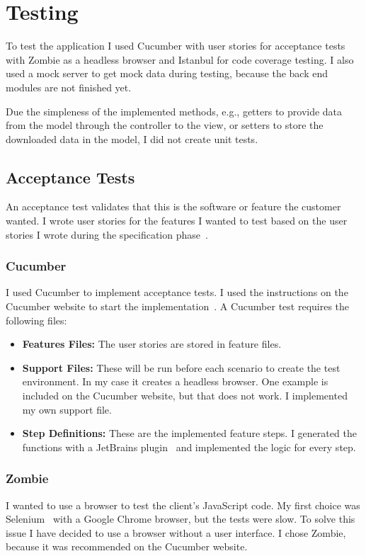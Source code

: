 \chapter{Testing}
\label{7-test}

To test the application I used Cucumber with user stories for acceptance tests with Zombie as a headless browser and Istanbul for code coverage testing. I also used a mock server to get mock data during testing, because the back end modules are not finished yet.

Due the simpleness of the implemented methods, e.g., getters to provide data from the model through the controller to the view, or setters to store the downloaded data in the model, I did not create unit tests.

\section{Acceptance Tests}
An acceptance test validates that this is the software or feature the customer wanted. I wrote user stories  for the features I wanted to test based on the user stories I wrote during the specification phase~\cite{szofttech}.

\subsection{Cucumber}
\label{cucumber-test}

I used Cucumber  to implement acceptance tests. I used the instructions on the Cucumber website to start the implementation~\cite{github-cucumberjs}. A Cucumber test requires the following files:

\begin{itemize}
	\item \textbf{Features Files:} The user stories are stored in feature files.
	\item \textbf{Support Files:} These will be run before each scenario to create the test environment. In my case it creates a headless browser. One example is included on the Cucumber website, but that does not work. I implemented my own support file.
	\item \textbf{Step Definitions:} These are the implemented feature steps. I generated the functions with a JetBrains plugin~\cite{jetbrains-cucumber} and implemented the logic for every step. 
\end{itemize}

\subsection{Zombie}
I wanted to use a browser to test the client's JavaScript code. My first choice was Selenium~\cite{selenium} with a Google Chrome browser, but the tests were slow. To solve this issue I have decided to use a browser without a user interface. I chose Zombie, because it was recommended on the Cucumber website.

